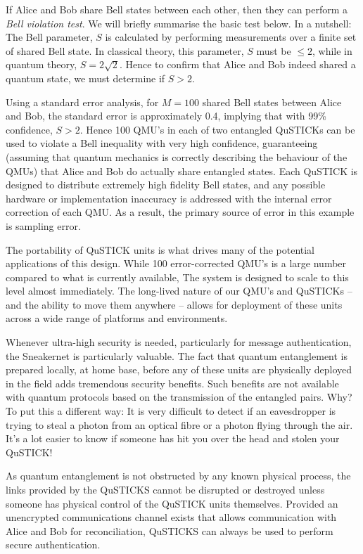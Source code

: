 \documentclass[twocolumn, aps, rmp, amsmath, amssymb, nofootinbib, superscriptaddress, longbibliography, floatfix, table-of-contents, eqsecnum]{revtex4-2}
\begin{document}
If Alice and Bob share Bell states between each other, then they can perform a \textit{Bell violation test}. We will briefly summarise the basic test below. In a nutshell: The Bell parameter, $S$ is calculated by performing measurements over a finite set of shared Bell state. In classical theory, this parameter, $S$ must be $\leq 2$, while in quantum theory, $S=2\sqrt{2}$. Hence to confirm that Alice and Bob indeed shared a quantum state, we must determine if $S>2$.

Using a standard error analysis, for $M = 100$ shared Bell states between Alice and Bob, the standard error is approximately 0.4, implying that with 99\% confidence, $S > 2$. Hence 100 QMU's in each of two entangled QuSTICKs can be used to violate a Bell inequality with very high confidence, guaranteeing (assuming that quantum mechanics is correctly describing the behaviour of the QMUs) that Alice and Bob do actually share entangled states. Each QuSTICK is designed to distribute extremely high fidelity Bell states, and any possible hardware or implementation inaccuracy is addressed with the internal error correction of each QMU. As a result, the primary source of error in this example is sampling error.

The portability of QuSTICK units is what drives many of the potential applications of this design. While 100 error-corrected QMU's is a large number compared to what is currently available, The system is designed to scale to this level almost immediately. The long-lived nature of our QMU's and QuSTICKs -- and the ability to move them anywhere -- allows for deployment of these units across a wide range of platforms and environments. 

Whenever ultra-high security is needed, particularly for message authentication, the Sneakernet is particularly valuable. The fact that quantum entanglement is prepared locally, at home base, before any of these units are physically deployed in the field adds tremendous security benefits. Such benefits are not available with quantum protocols based on the transmission of the entangled pairs. Why? To put this a different way: It is very difficult to detect if an eavesdropper is trying to steal a photon from an optical fibre or a photon flying through the air. It's a lot easier to know if someone has hit you over the head and stolen your QuSTICK!

As quantum entanglement is not obstructed by any known physical process, the links provided by the QuSTICKS cannot be disrupted or destroyed unless someone has physical control of the QuSTICK units themselves. Provided an unencrypted communications channel exists that allows communication with Alice and Bob for reconciliation, QuSTICKS can always be used to perform secure authentication. 
\end{document}
